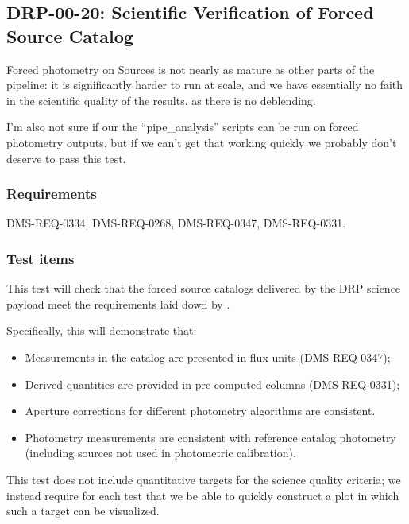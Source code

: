 \subsection{DRP-00-20: Scientific Verification of Forced Source Catalog}
\label{drp-00-20}

\begin{note}
Forced photometry on Sources is not nearly as mature as other parts of the pipeline: it is significantly harder to run at scale, and we have essentially no faith in the scientific quality of the results, as there is no deblending.

I'm also not sure if our the ``pipe\_analysis'' scripts can be run on forced
photometry outputs, but if we can't get that working quickly we probably don't deserve to pass this test.
\end{note}

\subsubsection{Requirements}

DMS-REQ-0334, DMS-REQ-0268, DMS-REQ-0347, DMS-REQ-0331.

\subsubsection{Test items}
\label{drp-00-20-items}

This test will check that the forced source catalogs delivered by the DRP
science payload meet the requirements laid down by .

Specifically, this will demonstrate that:

\begin{itemize}

  \item{Measurements in the catalog are presented in flux units
  (DMS-REQ-0347);}
  \item{Derived quantities are provided in pre-computed columns
  (DMS-REQ-0331);}
  \item{Aperture corrections for different photometry algorithms are consistent.}
  \item{Photometry measurements are consistent with reference catalog photometry (including sources not used in photometric calibration).}

\end{itemize}

This test does not include quantitative targets for the science quality criteria; we instead require for each test that we be able to quickly construct a plot in which such a target can be visualized.

